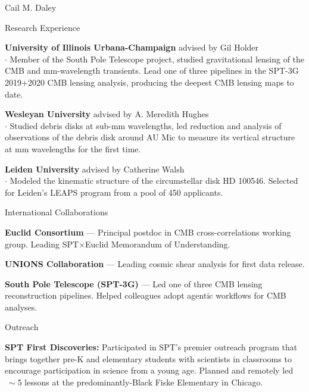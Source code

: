 \documentclass[11pt,a4paper]{article}
\begin{document}
\begin{cv}{Cail M. Daley}
\begin{cvlist}{Research Experience}
  \item[2019--2024]
    \textbf{University of Illinois Urbana-Champaign} \textbar{} advised by Gil Holder \\
    $\cdot$ Member of the South Pole Telescope project, studied gravitational lensing of the CMB and mm-wavelength transients.
    Lead one of three pipelines in the SPT-3G 2019+2020 CMB lensing analysis, producing the deepest CMB lensing maps to date.

  \item[2014--2018]
    \textbf{Wesleyan University} \textbar{} advised by A. Meredith Hughes \\
    $\cdot$ Studied debris disks at sub-mm wavelengths, led reduction and analysis of observations of the debris disk around AU Mic to measure its vertical structure at mm wavelengths for the first time.

  \item[2016--2017]
    \textbf{Leiden University} \textbar{} advised by Catherine Walsh \\
    $\cdot$ Modeled the kinematic structure of the circumstellar disk HD 100546. Selected for Leiden's LEAPS program from a pool of 450 applicants.
  \end{cvlist}

  \setlength{\cvlabelsep}{2em}
  \begin{cvlist}{International Collaborations}
  \item[2024--Present] \textbf{Euclid Consortium} --- Principal postdoc in CMB cross-correlations working group. Leading SPT$\times$Euclid Memorandum of Understanding.
  \item[2024--Present] \textbf{UNIONS Collaboration} --- Leading cosmic shear analysis for first data release.
  \item[2018--Present] \textbf{South Pole Telescope (SPT-3G)} --- Led one of three CMB lensing reconstruction pipelines. Helped colleagues adopt agentic workflows for CMB analyses.
  \end{cvlist}

  \begin{cvlist}{Outreach}
  \item[2020-2023] \textbf{SPT First Discoveries:} Participated in SPT's premier outreach program that brings together pre-K and elementary students with scientists in classrooms to encourage participation in science from a young age. Planned and remotely led $~\sim$5 lessons at the predominantly-Black Fiske Elementary in Chicago.


\end{cvlist}
\end{cv}
\end{document}
